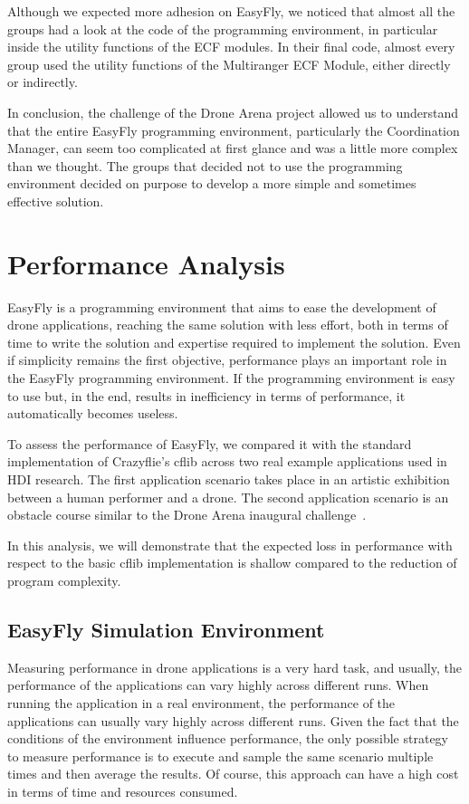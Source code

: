 Although we expected more adhesion on EasyFly, we noticed that almost all the groups had a look at the code of the programming environment, in particular inside the utility functions of the ECF modules. 
In their final code, almost every group used the utility functions of the Multiranger ECF Module, either directly or indirectly.

In conclusion, the challenge of the Drone Arena project allowed us to understand that the entire EasyFly programming environment, particularly the Coordination Manager, can seem too complicated at first glance and was a little more complex than we thought.
The groups that decided not to use the programming environment decided on purpose to develop a more simple and sometimes effective solution.


\section{Performance Analysis}\label{sec:performance_analysis}

EasyFly is a programming environment that aims to ease the development of drone applications, reaching the same solution with less effort, both in terms of time to write the solution and expertise required to implement the solution.
Even if simplicity remains the first objective, performance plays an important role in the EasyFly programming environment.
If the programming environment is easy to use but, in the end, results in inefficiency in terms of performance, it automatically becomes useless.

To assess the performance of EasyFly, we compared it with the standard implementation of Crazyflie's cflib across two real example applications used in HDI research.
The first application scenario takes place in an artistic exhibition between a human performer and a drone. 
The second application scenario is an obstacle course similar to the Drone Arena inaugural challenge~\cite{dronearenaChallenge}.

In this analysis, we will demonstrate that the expected loss in performance with respect to the basic cflib implementation is shallow compared to the reduction of program complexity.

\subsection{EasyFly Simulation Environment}\label{subsec:simulation_environment}
Measuring performance in drone applications is a very hard task, and usually, the performance of the applications can vary highly across different runs.
When running the application in a real environment, the performance of the applications can usually vary highly across different runs.
Given the fact that the conditions of the environment influence performance, the only possible strategy to measure performance is to execute and sample the same scenario multiple times and then average the results.
Of course, this approach can have a high cost in terms of time and resources consumed.

